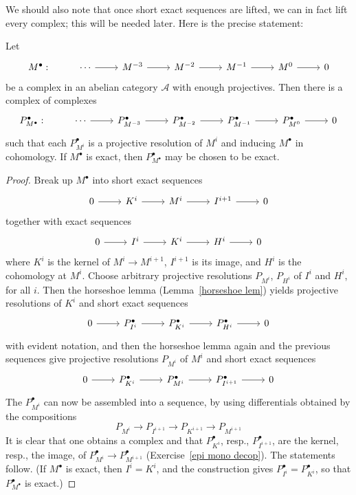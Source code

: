 We should also note that once short exact sequences are lifted, we can in fact lift every complex; this will be needed later. Here is the precise statement:
\begin{corollary}\label{reso complex}
Let
\[\begin{tikzcd}
M^\bullet:&\cdots\ar[r]&M^{-3}\ar[r]&M^{-2}\ar[r]&M^{-1}\ar[r]&M^{0}\ar[r]&0
\end{tikzcd}\]
be a complex in an abelian category $\mathcal{A}$ with enough projectives. Then there is a
complex of complexes
\[\begin{tikzcd}
P_{M^\bullet}^\bullet:&\cdots\ar[r]&P^\bullet_{M^{-3}}\ar[r]&P^\bullet_{M^{-2}}\ar[r]&P^\bullet_{M^{-1}}\ar[r]&P^\bullet_{M^{0}}\ar[r]&0
\end{tikzcd}\]
such that each $P^\bullet_{M^i}$ is a projective resolution of $M^i$ and inducing $M^\bullet$ in cohomology. If $M^\bullet$ is exact, then $P^\bullet_{M^\bullet}$ may be chosen to be exact.
\end{corollary}
\begin{proof}
Break up $M^\bullet$ into short exact sequences
\[\begin{tikzcd}
0\ar[r]&K^i\ar[r]&M^i\ar[r]&I^{i+1}\ar[r]&0
\end{tikzcd}\]
together with exact sequences
\[\begin{tikzcd}
0\ar[r]&I^i\ar[r]&K^i\ar[r]&H^{i}\ar[r]&0
\end{tikzcd}\]
where $K^i$ is the kernel of $M^i\to M^{i+1}$, $I^{i+1}$ is its image, and $H^i$ is the cohomology
at $M^i$. Choose arbitrary projective resolutions $P_{M^i}$, $P_{H^i}$ of $I^i$ and $H^i$, for all $i$. Then the horseshoe lemma (Lemma~\ref{horseshoe lem}) yields projective resolutions of $K^i$ and
short exact sequences
\[\begin{tikzcd}
0\ar[r]&P_{I^i}^\bullet\ar[r]&P_{K^i}^\bullet\ar[r]&P_{H^i}^\bullet\ar[r]&0
\end{tikzcd}\]
with evident notation, and then the horseshoe lemma again and the previous sequences give projective resolutions $P_{M^i}$ of $M^i$ and short exact sequences
\[\begin{tikzcd}
0\ar[r]&P_{K^i}^\bullet\ar[r]&P_{M^i}^\bullet\ar[r]&P_{I^{i+1}}^\bullet\ar[r]&0
\end{tikzcd}\]
The $P^\bullet_{M^i}$ can now be assembled into a sequence, by using differentials obtained by the compositions
\[P_{M^i}\to P_{I^{i+1}}\to P_{K^{i+1}}\to P_{M^{i+1}}\]
It is clear that one obtains a complex and that $P^\bullet_{K^i}$, resp., $P^\bullet_{I^{i+1}}$, are the kernel, resp., the image, of $P^\bullet_{M^i}\to P^\bullet_{M^{i+1}}$ 
(Exercise~\ref{epi mono decop}). The statements follow. (If $M^\bullet$ is exact, then $I^i=K^i$, and the construction gives $P_{I^i}^\bullet=P^\bullet_{K^i}$, so that $P^\bullet_{M^\bullet}$ is exact.)
\end{proof}
